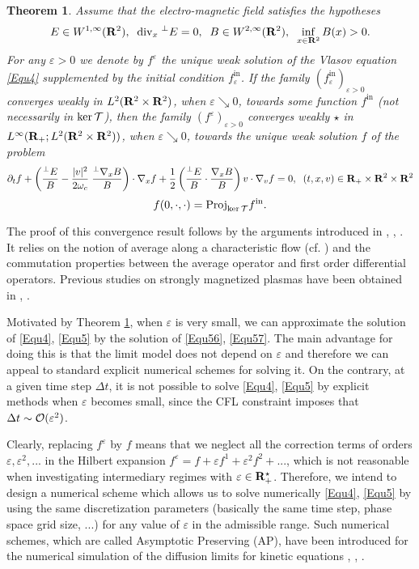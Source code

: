 \documentclass[12pt, a4paper]{article}
\providecommand\mathbb{\bf}
\newcommand\R{{\mathbb R}}
\newtheorem{thm}{Theorem}[section]
\newcommand{\eps}[0]{
\varepsilon}
\newcommand{\fe}[0]{
f ^\varepsilon}
\newcommand{\fo}[0]{
f ^1}
\newcommand{\fin}[0]{
f ^{\mathrm{in}}}
\newcommand{\fine}[0]{
f ^{\mathrm{in}}_{\varepsilon}}
\newcommand{\Divx}[0]{
\mathrm{div}_x}
\newcommand{\ltxv}[0]{
L^2(\R ^2 \times \R ^2)}
\begin{document}
\begin{thm}
\label{WeakConv} Assume that the electro-magnetic field satisfies the hypotheses 
$$
E \in W^{1,\infty} (\R^2), \;\;\Divx \;^\perp E = 0,\;\;B \in W^{2,\infty}(\R^2),\;\;\inf _{x \in \R^2} B(x) >0.
$$
For any $\eps >0$ we denote by $\fe$ the unique weak solution of the Vlasov equation \eqref{Equ4} supplemented by the initial condition $\fine$. If the family $(\fine )_{\eps >0}$ converges weakly in $\ltxv$, when $\eps \searrow 0$, towards some function $\fin$ (not necessarily in $\ker {\cal T}$), then the family $(\fe)_{\eps>0}$  converges weakly $\star$ in $L^\infty( \R_+; \ltxv)$, when $\eps \searrow 0$, towards the unique weak solution $f$ of the problem
\begin{equation}
\label{Equ56} \partial _t f + \left ( \frac{^\perp E}{B} - \frac{|v|^2}{2 \omega _c} \;\frac{^\perp \nabla _x B}{B}     \right ) \cdot \nabla _x f + \frac{1}{2} \left ( \frac{^\perp E}{B} \cdot \frac{\nabla _x B}{B}  \right ) v \cdot \nabla _v f = 0,\;\;(t,x,v) \in \R_+ \times \R ^2\times \R ^2
\end{equation}
\begin{equation}
\label{Equ57} f(0,\cdot, \cdot) = \mathrm{Proj} _{\ker {\cal T}} \fin.
\end{equation}
\end{thm}
The proof of this convergence result follows by the arguments introduced in \cite{BosAsyAna}, \cite{BosGuidCent3D}, \cite{Bos12}. It relies on the notion of average along a characteristic flow (cf. \cite{BosTraSin}) and the commutation properties between the average operator and first order differential operators. Previous studies on strongly magnetized plasmas have been obtained in \cite{FreSon98}, \cite{FreSon01}.

Motivated by Theorem \ref{WeakConv}, when $\eps$ is very small, we can approximate the solution of \eqref{Equ4}, \eqref{Equ5} by the solution of \eqref{Equ56}, \eqref{Equ57}. The main advantage for doing this is that the limit model does not depend on $\eps$ and therefore we can appeal to standard explicit numerical schemes for solving it. On the contrary, at a given time step $\Delta t$, it is not possible to solve \eqref{Equ4}, \eqref{Equ5} by explicit methods when $\eps$ becomes small, since the CFL constraint imposes that $\Delta t \sim {\cal O} (\eps ^2)$. 

Clearly, replacing $\fe$ by $f$ means that we neglect all the correction terms of orders $\eps, \eps ^2, ...$ in the Hilbert expansion $\fe = f + \eps \fo + \eps ^2 f ^2 + ...$, which is not reasonable when investigating intermediary regimes with $\eps \in \R_+ ^\star$. Therefore, we intend to design a numerical scheme which allows us to solve numerically \eqref{Equ4}, \eqref{Equ5} by using the same discretization parameters (basically the same time step, phase space grid size, ...) for any value of $\eps$ in the admissible range. Such numerical schemes, which are called Asymptotic Preserving (AP), have been introduced for the numerical simulation of the diffusion limits for kinetic equations \cite{Kla98}, \cite{Kla99}, \cite{JinParTos00}.
\end{document}
